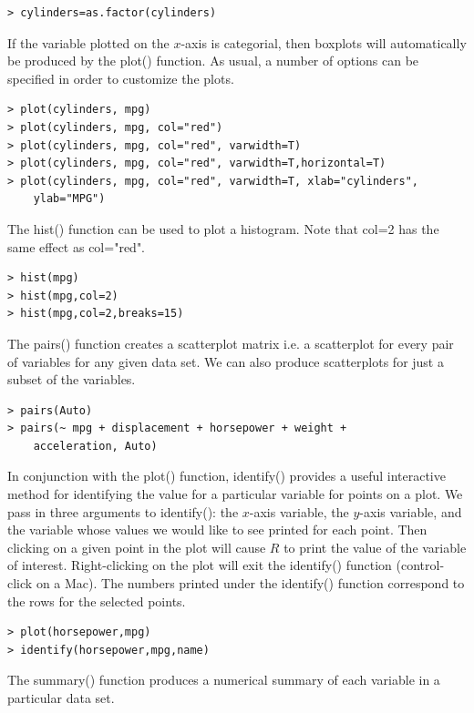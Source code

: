 \documentclass[10pt]{article}
\begin{document}
\begin{verbatim}
> cylinders=as.factor(cylinders)
\end{verbatim}

If the variable plotted on the $x$-axis is categorial, then boxplots will automatically be produced by the plot() function. As usual, a number of options can be specified in order to customize the plots.

\begin{verbatim}
> plot(cylinders, mpg)
> plot(cylinders, mpg, col="red")
> plot(cylinders, mpg, col="red", varwidth=T)
> plot(cylinders, mpg, col="red", varwidth=T,horizontal=T)
> plot(cylinders, mpg, col="red", varwidth=T, xlab="cylinders",
    ylab="MPG")
\end{verbatim}

The hist() function can be used to plot a histogram. Note that col=2 has the same effect as col="red".

\begin{verbatim}
> hist(mpg)
> hist(mpg,col=2)
> hist(mpg,col=2,breaks=15)
\end{verbatim}

The pairs() function creates a scatterplot matrix i.e. a scatterplot for every pair of variables for any given data set. We can also produce scatterplots for just a subset of the variables.

\begin{verbatim}
> pairs(Auto)
> pairs(~ mpg + displacement + horsepower + weight +
    acceleration, Auto)
\end{verbatim}

In conjunction with the plot() function, identify() provides a useful interactive method for identifying the value for a particular variable for points on a plot. We pass in three arguments to identify(): the $x$-axis variable, the $y$-axis variable, and the variable whose values we would like to see printed for each point. Then clicking on a given point in the plot will cause $R$ to print the value of the variable of interest. Right-clicking on the plot will exit the identify() function (control-click on a Mac). The numbers printed under the identify() function correspond to the rows for the selected points.

\begin{verbatim}
> plot(horsepower,mpg)
> identify(horsepower,mpg,name)
\end{verbatim}

The summary() function produces a numerical summary of each variable in a particular data set.
\end{document}
